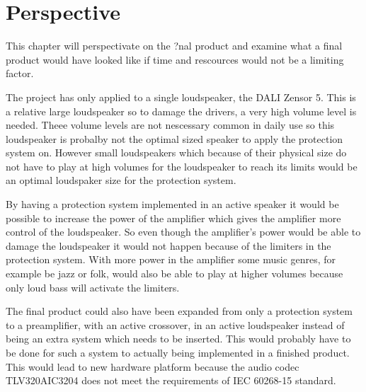 \chapter{Perspective}
This chapter will perspectivate on the ?nal product and examine what a final product would have looked like if time and rescources would not be a limiting factor.

The project has only applied to a single loudspeaker, the DALI Zensor 5. This is a relative large loudspeaker so to damage the drivers, a very high volume level is needed. Theee volume levels are not nescessary common in daily use so this loudspeaker is probalby not the optimal sized speaker to apply the protection system on. However small loudspeakers which because of their physical size do not have to play at high volumes for the loudspeaker to reach its limits would be an optimal loudspaker size for the protection system. 

By having a protection system implemented in an active speaker it would be possible to increase the power of the amplifier which gives the amplifier more control of the loudspeaker. So even though the amplifier's power would be able to damage the loudspeaker it would not happen because of the limiters in the protection system. With more power in the amplifier some music genres, for example be jazz or folk, would also be able to play at higher volumes because only loud bass will activate the limiters. 

The final product could also have been expanded from only a protection system to a preamplifier, with an active crossover, in an active loudspeaker instead of being an extra system which needs to be inserted. This would probably have to be done for such a system to actually being implemented in a finished product. This would lead to new hardware platform because the audio codec TLV320AIC3204 does not meet the requirements of IEC 60268-15 standard.  

